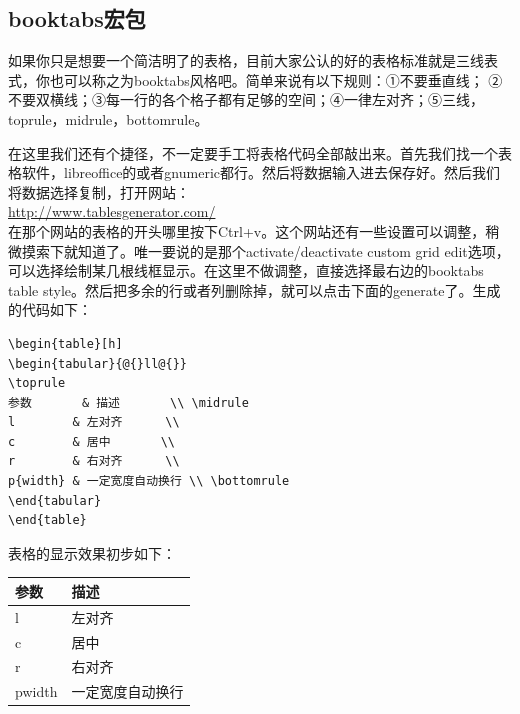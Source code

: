 \documentclass[12pt,oneside]{book}
\begin{document}
\begin{common-format}
\subsection{booktabs宏包}
如果你只是想要一个简洁明了的表格，目前大家公认的好的表格标准就是三线表式，你也可以称之为booktabs风格吧。简单来说有以下规则：①不要垂直线； ②不要双横线；③每一行的各个格子都有足够的空间；④一律左对齐；⑤三线，toprule，midrule，bottomrule。

在这里我们还有个捷径，不一定要手工将表格代码全部敲出来。首先我们找一个表格软件，libreoffice的或者gnumeric都行。然后将数据输入进去保存好。然后我们将数据选择复制，打开网站：\\ \href{http://www.tablesgenerator.com/}{http://www.tablesgenerator.com/}\\在那个网站的表格的开头哪里按下Ctrl+v。这个网站还有一些设置可以调整，稍微摸索下就知道了。唯一要说的是那个activate/deactivate custom grid edit选项，可以选择绘制某几根线框显示。在这里不做调整，直接选择最右边的booktabs table style。然后把多余的行或者列删除掉，就可以点击下面的generate了。生成的代码如下：
\begin{Verbatim}
\begin{table}[h]
\begin{tabular}{@{}ll@{}}
\toprule
参数       & 描述       \\ \midrule
l        & 左对齐      \\
c        & 居中       \\
r        & 右对齐      \\
p{width} & 一定宽度自动换行 \\ \bottomrule
\end{tabular}
\end{table}
\end{Verbatim}
表格的显示效果初步如下：
\begin{table}[H]
\begin{tabular}{@{}ll@{}}
\toprule
参数       & 描述       \\ \midrule
l        & 左对齐      \\
c        & 居中       \\
r        & 右对齐      \\
p{width} & 一定宽度自动换行 \\ \bottomrule
\end{tabular}
\end{table}


\end{common-format}
\end{document}
